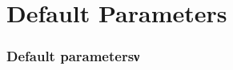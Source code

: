 \section[Defaults]{Default Parameters}

\graphicspath{{Chapter3/Figs/Vector/}}

\begin{frame}
  \frametitle{Default parametersν}
  \framesubtitle{}
  \label{fr3:frank_tr}
\end{frame}
\note{} %